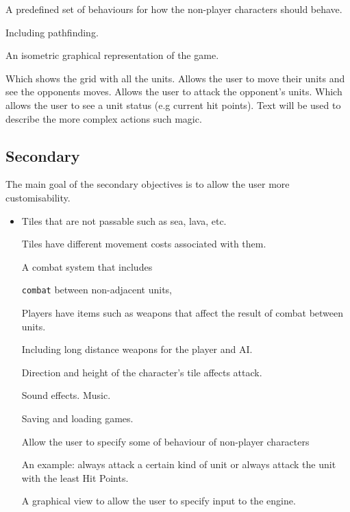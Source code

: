 \begin{itemize}
\begin{itemize}
\begin{itemize}
		\end{itemize}
	
	\tick A predefined set of behaviours for how the non-player characters should behave.
	\begin{itemize}
		\tick Including pathfinding.
	\end{itemize}
	
	\tick An isometric graphical representation of the game.
	\begin{itemize}
		\tick Which shows the grid with all the units.
		\tick Allows the user to move their units and see the opponents moves.
		\tick Allows the user to attack the opponent's units.
		\tick Which allows the user to see a unit status (e.g current hit points).
		\tick Text will be used to describe the more complex actions such magic.
	\end{itemize}
\end{itemize}
\end{itemize}

\subsection{Secondary}
\label{secondary}

The main goal of the secondary objectives is to allow the user more customisability. 
\begin{itemize}
	\tick Tiles have \texttt{height}, where units can only move to tiles of a smilier height.
	\item Tiles that are not passable such as sea, lava, etc.
	
	\tick Tiles have different movement costs associated with them.
	
	\tick A combat system that includes 
	\begin{itemize}
		\tick \texttt{combat} between non-adjacent units,
	\end{itemize}
	
	\tick Players have items such as weapons that affect the result of combat between units. 
	\begin{itemize}
		\tick Including long distance weapons for the player and AI.
	\end{itemize}
	
	\partly Direction and height of the character's tile affects attack.
	
	\tick Sound effects.
	\tick Music.
	
	\cross Saving and loading games.
	
	\partly Allow the user to specify some of behaviour of non-player characters
	\begin{itemize}
		\tick An example: always attack a certain kind of unit or always attack the unit with the least Hit Points.
	\end{itemize}
	
	\tick A graphical view to allow the user to specify input to the engine.
\end{itemize}

